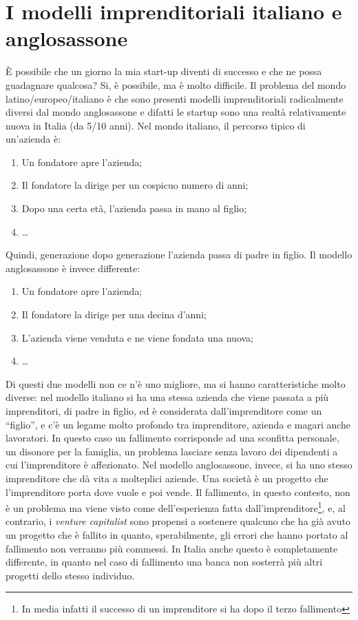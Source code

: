 \section{I modelli imprenditoriali italiano e anglosassone}
È possibile che un giorno la mia start-up diventi di successo e che ne possa
guadagnare qualcosa? Si, è possibile, ma è molto difficile.
Il problema del mondo latino/europeo/italiano è che sono presenti modelli
imprenditoriali radicalmente diversi dal mondo anglosassone e difatti
le startup sono una realtà relativamente nuova in Italia (da 5/10 anni).
Nel mondo italiano, il percorso tipico di un'azienda è:
\begin{enumerate}
 \item Un fondatore apre l'azienda;
 \item Il fondatore la dirige per un cospicuo numero di anni;
 \item Dopo una certa età, l'azienda passa in mano al figlio;
 \item \dots
\end{enumerate}
Quindi, generazione dopo generazione l'azienda passa di padre in figlio.
Il modello anglosassone è invece differente:
\begin{enumerate}
 \item Un fondatore apre l'azienda;
 \item Il fondatore la dirige per una decina d'anni;
 \item L'azienda viene venduta e ne viene fondata una nuova;
 \item \dots
\end{enumerate}
Di questi due modelli non ce n'è uno migliore, ma si hanno caratteristiche
molto diverse: nel modello italiano si ha una stessa azienda che viene passata
a più imprenditori, di padre in figlio, ed è considerata dall'imprenditore come
un ``figlio'', e c'è un legame molto profondo tra imprenditore, azienda e
magari anche lavoratori. In questo caso un fallimento corrisponde ad una
sconfitta personale, un disonore per la famiglia, un problema lasciare senza
lavoro dei dipendenti a cui l'imprenditore è affezionato. Nel modello
anglosassone, invece, si ha uno stesso imprenditore che dà vita a molteplici
aziende. Una società è un progetto che l'imprenditore porta dove vuole e poi
vende. Il fallimento, in questo contesto, non è un problema ma viene visto come
dell'esperienza fatta dall'imprenditore\footnote{In media infatti il successo
di un imprenditore si ha dopo il terzo fallimento}, e, al contrario, i
\textit{venture capitalist} sono propensi a sostenere qualcuno che ha già avuto
un progetto che è fallito in quanto, sperabilmente, gli errori che hanno
portato al fallimento non verranno più commessi. In Italia anche questo è
completamente differente, in quanto nel caso di fallimento una banca non
sosterrà più altri progetti dello stesso individuo.
